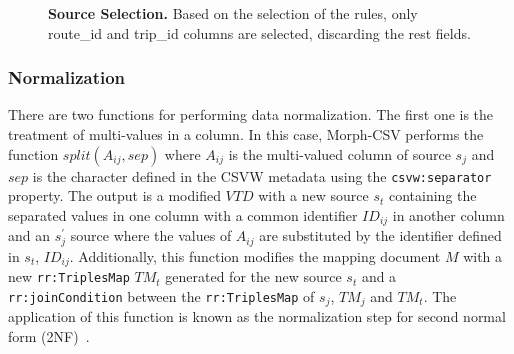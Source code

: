 \begin{figure}[ht]
\centering
{}
\caption[Source selection]{\textbf{Source Selection.} Based on the selection of the rules, only route\_id and trip\_id columns are selected, discarding the rest fields.}
\label{fig:selection2}
\end{figure}

\subsubsection*{Normalization}
There are two functions for performing data normalization. The first one is the treatment of multi-values in a column. In this case, Morph-CSV performs the function $split(A_{ij},sep)$ where $A_{ij}$ is the multi-valued column of source $s_{j}$ and $sep$ is the character defined in the CSVW metadata using the \texttt{csvw:separator} property. The output is a modified $VTD$ with a new source $s_t$ containing the separated values in one column with a common identifier $ID_{ij}$ in another column and an $s_{j}^{'}$ source where the values of $A_{ij}$ are substituted by the identifier defined in $s_t$, $ID_{ij}$. Additionally, this function modifies the mapping document $M$ with a new \texttt{rr:TriplesMap} $TM_t$ generated for the new source $s_t$ and a \texttt{rr:joinCondition} between the \texttt{rr:TriplesMap} of $s_j$, $TM_j$ and $TM_t$. The application of this function is known as the normalization step for second normal form (2NF)~\citep{codd1979extending}.
 
